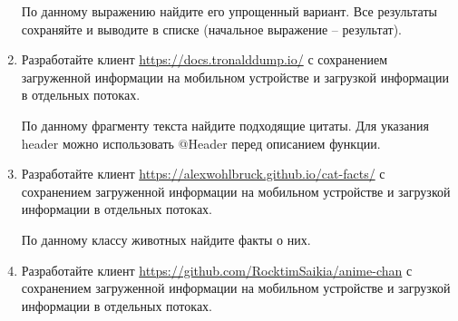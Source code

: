 \begin{enumerate}
		По данному выражению найдите его упрощенный вариант. Все результаты сохраняйте и выводите в списке (начальное выражение -- результат).



	\item Разработайте клиент \url{https://docs.tronalddump.io/} с сохранением загруженной информации на мобильном устройстве и загрузкой
		информации в отдельных потоках. 

		По данному фрагменту текста найдите подходящие цитаты. Для указания header можно использовать @Header перед описанием функции.

	\item Разработайте клиент \url{https://alexwohlbruck.github.io/cat-facts/} с сохранением загруженной информации на мобильном устройстве и загрузкой
		информации в отдельных потоках. 

		По данному классу животных найдите факты о них.

	\item Разработайте клиент \url{https://github.com/RocktimSaikia/anime-chan} с сохранением загруженной информации на мобильном устройстве и загрузкой
		информации в отдельных потоках. 


\end{enumerate}
